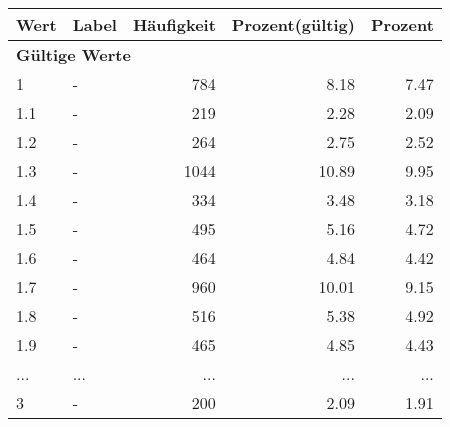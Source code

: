      \begin{longtable}{lXrrr}
     \toprule
     \textbf{Wert} & \textbf{Label} & \textbf{Häufigkeit} & \textbf{Prozent(gültig)} & \textbf{Prozent} \\
     \endhead
     \midrule
     \multicolumn{5}{l}{\textbf{Gültige Werte}}\\
        1 & \multicolumn{1}{X}{-} & %
          \num{784} &
          \num[round-mode=places,round-precision=2]{8,18} &
          \num[round-mode=places,round-precision=2]{7,47} \\
        1.1 & \multicolumn{1}{X}{-} & %
          \num{219} &
          \num[round-mode=places,round-precision=2]{2,28} &
          \num[round-mode=places,round-precision=2]{2,09} \\
        1.2 & \multicolumn{1}{X}{-} & %
          \num{264} &
          \num[round-mode=places,round-precision=2]{2,75} &
          \num[round-mode=places,round-precision=2]{2,52} \\
        1.3 & \multicolumn{1}{X}{-} & %
          \num{1044} &
          \num[round-mode=places,round-precision=2]{10,89} &
          \num[round-mode=places,round-precision=2]{9,95} \\
        1.4 & \multicolumn{1}{X}{-} & %
          \num{334} &
          \num[round-mode=places,round-precision=2]{3,48} &
          \num[round-mode=places,round-precision=2]{3,18} \\
        1.5 & \multicolumn{1}{X}{-} & %
          \num{495} &
          \num[round-mode=places,round-precision=2]{5,16} &
          \num[round-mode=places,round-precision=2]{4,72} \\
        1.6 & \multicolumn{1}{X}{-} & %
          \num{464} &
          \num[round-mode=places,round-precision=2]{4,84} &
          \num[round-mode=places,round-precision=2]{4,42} \\
        1.7 & \multicolumn{1}{X}{-} & %
          \num{960} &
          \num[round-mode=places,round-precision=2]{10,01} &
          \num[round-mode=places,round-precision=2]{9,15} \\
        1.8 & \multicolumn{1}{X}{-} & %
          \num{516} &
          \num[round-mode=places,round-precision=2]{5,38} &
          \num[round-mode=places,round-precision=2]{4,92} \\
        1.9 & \multicolumn{1}{X}{-} & %
          \num{465} &
          \num[round-mode=places,round-precision=2]{4,85} &
          \num[round-mode=places,round-precision=2]{4,43} \\
       ... & ... & ... & ... & ... \\
        3 & \multicolumn{1}{X}{-} & %
          \num{200} &
          \num[round-mode=places,round-precision=2]{2,09} &
          \num[round-mode=places,round-precision=2]{1,91} \\


\end{longtable}
